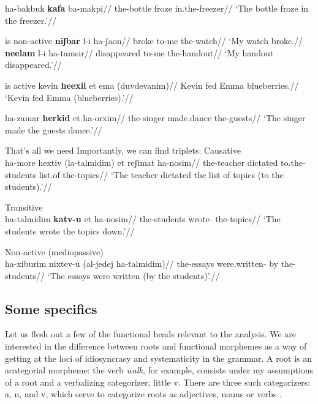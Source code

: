 	\a \begingl
		\gla ha-bakbuk \textbf{kafa} ba-makpi//
		\glb the-bottle froze in.the-freezer//
		\glft `The bottle froze in the freezer.'//
	\endgl
\xe


{\tnif} is non-active
\pex
	\a \begingl
		\gla \textbf{niʃbar} l-i ha-ʃaon//
		\glb broke to-me the-watch//
		\glft `My watch broke.//
	\endgl
	\a \begingl
		\gla \textbf{neelam} l-i ha-tamsir//
		\glb disappeared to-me the-handout//
		\glft `My handout disappeared.'//
	\endgl
\xe

{\thif} is active
\pex
	\a \begingl
		\gla kevin \textbf{heexil} et ema (duvdevanim)//
		\glb Kevin fed  Emma blueberries.//
		\glft `Kevin fed Emma (blueberries).'//
	\endgl %
		
	\a \begingl
		\gla ha-zamar \textbf{herkid} et ha-orxim//
		\glb the-singer made.dance  the-guests//
		\glft `The singer made the guests dance.'//
	\endgl
\xe


That's all we need
\pex Importantly, we can find triplets:
	\a Causative {\thif}\\
		\begingl
		\gla ha-more hextiv (la-talmidim) et reʃimat ha-nosim//
		\glb the-teacher dictated to.the-students  list.of the-topics//
		\glft `The teacher dictated the list of topics (to the students).'//
	\endgl
	
	\a Transitive {\tkal}\\
		\begingl
		\gla ha-talmidim \textbf{katv-u} et ha-nosim//
		\glb the-students wrote-  the-topics//
		\glft `The students wrote the topics down.'//
	\endgl
	
	\a Non-active (mediopassive) {\tnif}\\
		\begingl
		\gla ha-xiburim nixtev-u (al-jedej ha-talmidim)//
		\glb the-essays were.written- by the-students//
		\glft `The essays were written (by the students)'.//
	\endgl
\xe



	\subsection{Some specifics}
Let us flesh out a few of the functional heads relevant to the analysis. We are interested in the difference between roots and functional morphemes as a way of getting at the loci of idiosyncrasy and systematicity in the grammar. A root is an acategorial morpheme: the verb \emph{walk}, for example, consists under my assumptions of a root  and a verbalizing categorizer, little v. There are three such categorizers: a, n, and v, which serve to categorize roots as adjectives, nouns or verbs \citep{marantz01,arad05,woodmarantz15}.


